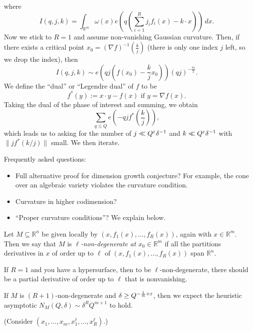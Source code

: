 \documentclass[reqno]{amsart} 
\numberwithin{theorem}{section}
\numberwithin{equation}{section}
\begin{document}
where
\begin{equation*}
  I(q, j, k) = \int_{\mathbb{R}^m} \omega(x) e \left( q \left( \sum_{i = 1}^R j_i f_i(x) - k \cdot x \right) \right) \, d x.
\end{equation*}
Now we stick to $R = 1$ and assume non-vanishing Gaussian curvature.  Then, if there exists a critical point $x_0 =(\nabla f)^{-1} \left( \frac{k}{j} \right)$ (there is only one index $j$ left, so we drop the index), then
\begin{equation*}
  I(q, j, k) \sim e \left( q j \left( f(x_0) - \frac{k}{j} x_0 \right) \right)(q j)^{- \frac{m}{2}}.
\end{equation*}
We define the ``dual'' or ``Legendre dual'' of $f$ to be
\begin{equation*}
  f^\ast(y) := x \cdot y - f(x) \text{ if } y = \nabla f(x).
\end{equation*}
Taking the dual of the phase of interest and summing, we obtain
\begin{equation*}
  \sum_{q \leq Q} e\left(- q j f^\ast \left( \frac{k}{j} \right)\right),
\end{equation*}
which leads us to asking for the number of $j \ll Q^\varepsilon \delta^{-1}$ and $k \ll Q^\varepsilon \delta^{-1}$ with $\lVert   j f^\ast ( k/j ) \rVert$ small.  We then iterate.

Frequently asked questions:
\begin{itemize}
\item Full alternative proof for dimension growth conjecture?  For example, the cone over an algebraic variety violates the curvature condition.
\item Curvature in higher codimension?
\item ``Proper curvature conditions''?  We explain below.
\end{itemize}
\begin{definition}
  Let $M \subseteq \mathbb{R}^n$ be given locally by $(x, f_1(x), \dotsc, f_R(x))$, again with $x \in \mathbb{R}^m$.  Then we say that $M$ is $\ell$\emph{-non-degenerate at $x_0 \in \mathbb{R}^m$} if all the partitions derivatives in $x$ of order up to $\ell$ of $(x, f_1(x), \dotsc, f_R(x))$ span $\mathbb{R}^n$.
\end{definition}
\begin{example}
  If $R = 1$ and you have a hypersurface, then to be $\ell$-non-degenerate, there should be a partial derivative of order up to $\ell$ that is nonvanishing.
\end{example}
\begin{conjecture}[Huang '22]
  If $M$ is $(R + 1)$-non-degenerate and $\delta \geq Q^{- \frac{1}{R} + \varepsilon}$, then we expect the heuristic asymptotic $N_M(Q, \delta) \sim \delta^R Q^{m + 1}$ to hold.
\end{conjecture}
(Consider $(x_1, \dotsc, x_m, x_1^{\ell}, \dotsc, x_R^{\ell})$.)
\end{document}
